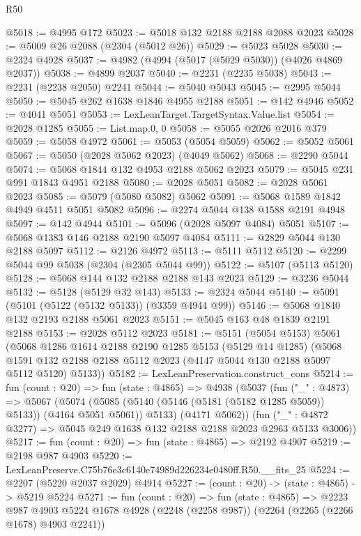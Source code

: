 \begin{lexlean}{R50}
\begin{coremodule}
@5018 := @4995 @172
@5023 := @5018 @132 @2188 @2188 @2088 @2023
@5028 := @5009 @26 @2088 (@2304 (@5012 @26))
@5029 := @5023 @5028
@5030 := @2324 @4928
@5037 := @4982 (@4994 (@5017 (@5029 @5030)) (@4026 @4869 @2037))
@5038 := @4899 @2037
@5040 := @2231 (@2235 @5038)
@5043 := @2231 (@2238 @2050) @2241
@5044 := @5040 @5043
@5045 := @2995 @5044
@5050 := @5045 @262 @1638 @1846 @4955 @2188
@5051 := @142 @4946
@5052 := @4041 @5051
@5053 := LexLeanTarget.TargetSyntax.Value.list
@5054 := @2028 @1285
@5055 := List.map.{0, 0}
@5058 := @5055 @2026 @2016 @379
@5059 := @5058 @4972
@5061 := @5053 (@5054 @5059)
@5062 := @5052 @5061
@5067 := @5050 (@2028 @5062 @2023) (@4049 @5062)
@5068 := @2290 @5044
@5074 := @5068 @1844 @132 @4953 @2188 @5062 @2023
@5079 := @5045 @231 @991 @1843 @4951 @2188
@5080 := @2028 @5051
@5082 := @2028 @5061 @2023
@5085 := @5079 (@5080 @5082) @5062
@5091 := @5068 @1589 @1842 @4949 @4511 @5051 @5082
@5096 := @2274 @5044 @138 @1588 @2191 @4948
@5097 := @142 @4944
@5101 := @5096 (@2028 @5097 @4084) @5051
@5107 := @5068 @1383 @146 @2188 @2190 @5097 @4084
@5111 := @2829 @5044 @130 @2188 @5097
@5112 := @2126 @4972
@5113 := @5111 @5112
@5120 := @2299 @5044 @99 @5038 (@2304 (@2305 @5044 @99))
@5122 := @5107 (@5113 @5120)
@5128 := @5068 @144 @132 @2188 @2188 @143 @2023
@5129 := @3236 @5044
@5132 := @5128 (@5129 @32 @143)
@5133 := @2324 @5044
@5140 := @5091 (@5101 (@5122 (@5132 @5133)) (@3359 @4944 @99))
@5146 := @5068 @1840 @132 @2193 @2188 @5061 @2023
@5151 := @5045 @163 @48 @1839 @2191 @2188
@5153 := @2028 @5112 @2023
@5181 := @5151
    (@5054 @5153)
    @5061
    (@5068
      @1286
      @1614
      @2188
      @2190
      @1285
      @5153
      (@5129 @14 @1285)
      (@5068 @1591 @132 @2188 @2188 @5112 @2023 (@4147 @5044 @130 @2188 @5097 @5112 @5120) @5133))
@5182 := LexLeanPreservation.construct_cons
@5214 := fun (count : @20) =>
  fun (state : @4865) =>
  @4938
    (@5037
      (fun ("_" : @4873) =>
      @5067
        (@5074 (@5085 (@5140 (@5146 (@5181 (@5182 @1285 @5059)) @5133)) (@4164 @5051 @5061)) @5133)
        (@4171 @5062))
      (fun ("_" : @4872 @3277) => @5045 @249 @1638 @132 @2188 @2188 @2023 @2963 @5133 @3006))
@5217 := fun (count : @20) => fun (state : @4865) => @2192 @4907
@5219 := @2198 @987 @4903
@5220 := LexLeanPreserve.C75b76e3c6140e74989d226234e0480ff.R50.__fits_25
@5224 := @2207 (@5220 @2037 @2029) @4914
@5227 := (count : @20) -> (state : @4865) -> @5219 @5224
@5271 := fun (count : @20) =>
  fun (state : @4865) =>
  @2223
    @987
    @4903
    @5224
    @1678
    @4928
    (@2248 (@2258 @987))
    (@2264 (@2265 (@2266 @1678) @4903 @2241))

\end{coremodule}
\end{lexlean}

